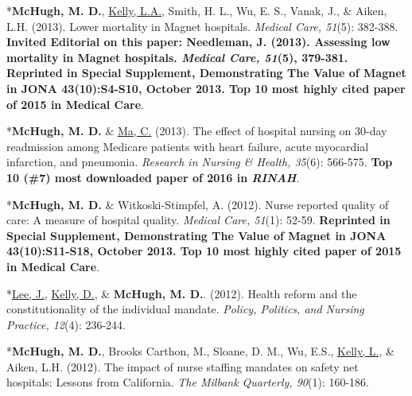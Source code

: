 \documentclass[10pt,]{article}
\begin{document}
{{{{{{{{{{{{{{{\begin{hangparas}{.25in}{1}
*{\textbf {McHugh, M. D.}}, {\underline {Kelly, L.A.}}, Smith, H. L., Wu, E. S., Vanak, J., \& Aiken, L.H. (2013). Lower mortality in Magnet hospitals. {\textit {Medical Care, 51}}(5): 382-388. {\textbf {Invited Editorial on this paper: Needleman, J. (2013). Assessing low mortality in Magnet hospitals. {\textit {Medical Care, 51}}(5), 379-381. Reprinted in Special Supplement, Demonstrating The Value of Magnet in JONA 43(10):S4-S10, October 2013. Top 10 most highly cited paper of 2015 in Medical Care}}.

\end{hangparas}



\begin{hangparas}{.25in}{1}

*{\textbf {McHugh, M. D.}} \& {\underline {Ma, C.}} (2013). The effect of hospital nursing on 30-day readmission among Medicare patients with heart failure, acute myocardial infarction, and pneumonia. {\textit {Research in Nursing \& Health, 35}}(6): 566-575. {\textbf {Top 10 (\#7) most downloaded paper of 2016 in {\textit {RINAH}}}}.

\end{hangparas}



\begin{hangparas}{.25in}{1}

*{\textbf {McHugh, M. D.}} \& Witkoski-Stimpfel, A. (2012). Nurse reported quality of care: A measure of hospital quality. {\textit {Medical Care, 51}}(1): 52-59. {\textbf {Reprinted in Special Supplement, Demonstrating The Value of Magnet in JONA 43(10):S11-S18, October 2013. Top 10 most highly cited paper of 2015 in Medical Care}}.

\end{hangparas}



\begin{hangparas}{.25in}{1}

*{\underline {Lee, J.}}, {\underline {Kelly, D.}}, \& {\textbf {McHugh, M. D.}}. (2012). Health reform and the constitutionality of the individual mandate. {\textit {Policy, Politics, and Nursing Practice, 12}}(4): 236-244.

\end{hangparas}



\begin{hangparas}{.25in}{1}

*{\textbf {McHugh, M. D.}}, Brooks Carthon, M., Sloane, D. M., Wu, E.S., {\underline {Kelly, L.}}, \& Aiken, L.H. (2012). The impact of nurse staffing mandates on safety net hospitals: Lessons from California. {\textit {The Milbank Quarterly, 90}}(1): 160-186.


\end{hangparas}}}}}}}}}}}}}}}}
\end{document}
